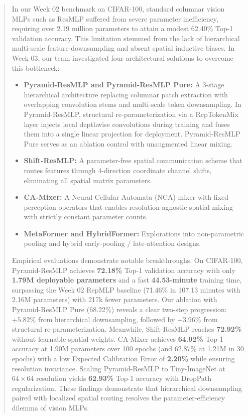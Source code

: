 \begin{abstract}
In our Week 02 benchmark on CIFAR-100, standard columnar vision MLPs such as ResMLP suffered from severe parameter inefficiency, requiring over 2.19 million parameters to attain a modest 62.40\% Top-1 validation accuracy. This limitation stemmed from the lack of hierarchical multi-scale feature downsampling and absent spatial inductive biases. In Week 03, our team investigated four architectural solutions to overcome this bottleneck:
\begin{itemize}
    \item \textbf{Pyramid-ResMLP and Pyramid-ResMLP Pure:} A 3-stage hierarchical architecture replacing columnar patch extraction with overlapping convolution stems and multi-scale token downsampling. In Pyramid-ResMLP, structural re-parameterization via a RepTokenMix layer injects local depthwise convolutions during training and fuses them into a single linear projection for deployment. Pyramid-ResMLP Pure serves as an ablation control with unaugmented linear mixing.
    \item \textbf{Shift-ResMLP:} A parameter-free spatial communication scheme that routes features through 4-direction coordinate channel shifts, eliminating all spatial matrix parameters.
    \item \textbf{CA-Mixer:} A Neural Cellular Automata (NCA) mixer with fixed perception operators that enables resolution-agnostic spatial mixing with strictly constant parameter counts.
    \item \textbf{MetaFormer and HybridFormer:} Explorations into non-parametric pooling and hybrid early-pooling / late-attention designs.
\end{itemize}

Empirical evaluations demonstrate notable breakthroughs. On CIFAR-100, Pyramid-ResMLP achieves \textbf{72.18\%} Top-1 validation accuracy with only \textbf{1.79M deployable parameters} and a fast \textbf{44.53-minute} training time, surpassing the Week 02 RepMLP baseline (71.46\% in 107.13 minutes with 2.16M parameters) with 217k fewer parameters. Our ablation with Pyramid-ResMLP Pure (68.22\%) reveals a clear two-step progression: $+5.82\%$ from hierarchical downsampling, followed by $+3.96\%$ from structural re-parameterization. Meanwhile, Shift-ResMLP reaches \textbf{72.92\%} without learnable spatial weights. CA-Mixer achieves \textbf{64.92\%} Top-1 accuracy at 1.90M parameters over 100 epochs (and 62.87\% at 1.21M in 30 epochs) with a low Expected Calibration Error of \textbf{2.20\%} while ensuring resolution invariance. Scaling Pyramid-ResMLP to Tiny-ImageNet at $64 \times 64$ resolution yields \textbf{62.93\%} Top-1 accuracy with DropPath regularization. These findings demonstrate that hierarchical downsampling paired with localized spatial routing resolves the parameter-efficiency dilemma of vision MLPs.
\end{abstract}

